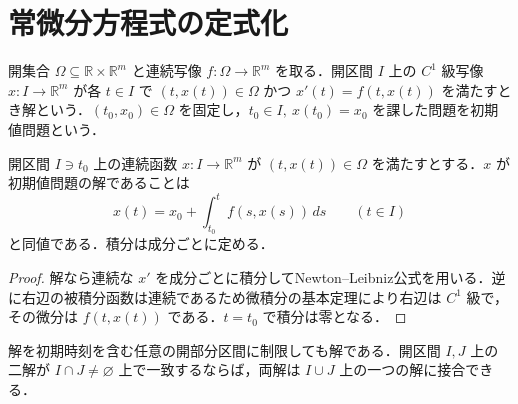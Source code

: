\section{常微分方程式の定式化}
\begin{defn}[常微分方程式と初期値問題]
開集合 $\Omega\subseteq\mathbb R\times\mathbb R^m$ と連続写像 $f:\Omega\to\mathbb R^m$ を取る．開区間 $I$ 上の $C^1$ 級写像 $x:I\to\mathbb R^m$ が各 $t\in I$ で $(t,x(t))\in\Omega$ かつ $x'(t)=f(t,x(t))$ を満たすとき解という．$(t_0,x_0)\in\Omega$ を固定し，$t_0\in I,\ x(t_0)=x_0$ を課した問題を初期値問題という．
\end{defn}
\begin{prop}[初期値問題と積分方程式の同値性]
開区間 $I\ni t_0$ 上の連続函数 $x:I\to\mathbb R^m$ が $(t,x(t))\in\Omega$ を満たすとする．$x$ が初期値問題の解であることは
\[
x(t)=x_0+\int_{t_0}^tf(s,x(s))\,ds\qquad(t\in I)
\]
と同値である．積分は成分ごとに定める．
\end{prop}
\begin{proof}
解なら連続な $x'$ を成分ごとに積分してNewton–Leibniz公式を用いる．逆に右辺の被積分函数は連続であるため微積分の基本定理により右辺は $C^1$ 級で，その微分は $f(t,x(t))$ である．$t=t_0$ で積分は零となる．
\end{proof}
\begin{prop}[解の制限と接合]
解を初期時刻を含む任意の開部分区間に制限しても解である．開区間 $I,J$ 上の二解が $I\cap J\ne\varnothing$ 上で一致するならば，両解は $I\cup J$ 上の一つの解に接合できる．
\end{prop}
